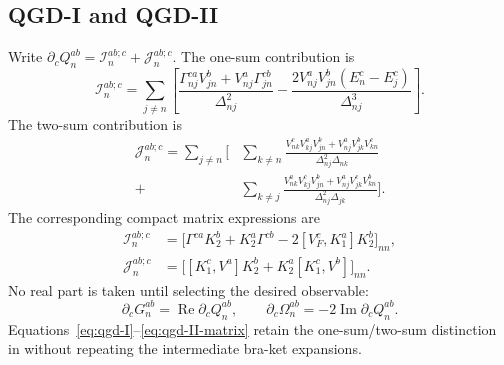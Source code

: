 \documentclass[prx,amsmath,amssymb,superscriptaddress,longbibliography]{revtex4-2}
\newcommand{\Rea}{\operatorname{Re}}
\newcommand{\Ima}{\operatorname{Im}}
\newcommand{\code}[1]{\texttt{\detokenize{#1}}}
\begin{document}
\subsection{QGD-I and QGD-II}
Write $\partial_cQ_n^{ab}=\mathcal I_n^{ab;c}+\mathcal J_n^{ab;c}$.
The one-sum contribution is
\begin{equation}
 \mathcal I_n^{ab;c}=\sum_{j\ne n}\left[
 \frac{\Gamma_{nj}^{ca}V_{jn}^b+V_{nj}^a\Gamma_{jn}^{cb}}{\Delta_{nj}^2}
 -\frac{2V_{nj}^aV_{jn}^b(E_n^c-E_j^c)}{\Delta_{nj}^3}\right].
 \label{eq:qgd-I}
\end{equation}
The two-sum contribution is
\begin{align}
 \mathcal J_n^{ab;c}=\sum_{j\ne n}\bigg[
 &\sum_{k\ne n}\frac{V_{nk}^cV_{kj}^aV_{jn}^b
                        +V_{nj}^aV_{jk}^bV_{kn}^c}
                       {\Delta_{nj}^2\Delta_{nk}}
 \nonumber\\
 +&\sum_{k\ne j}\frac{V_{nk}^aV_{kj}^cV_{jn}^b
                        +V_{nj}^aV_{jk}^cV_{kn}^b}
                       {\Delta_{nj}^2\Delta_{jk}}\bigg].
 \label{eq:qgd-II}
\end{align}
The corresponding compact matrix expressions are
\begin{align}
 \mathcal I_n^{ab;c}
 &=\big[\Gamma^{ca}K_2^b+K_2^a\Gamma^{cb}
        -2[V_F^c,K_1^a]K_2^b\big]_{nn},\label{eq:qgd-I-matrix}\\
 \mathcal J_n^{ab;c}
 &=\big[[K_1^c,V^a]K_2^b+K_2^a[K_1^c,V^b]\big]_{nn}.
 \label{eq:qgd-II-matrix}
\end{align}
No real part is taken until selecting the desired observable:
\begin{equation}
 \partial_cG_n^{ab}=\Rea\partial_cQ_n^{ab},\qquad
 \partial_c\Omega_n^{ab}=-2\Ima\partial_cQ_n^{ab}.
 \label{eq:qgd-observables}
\end{equation}
Equations~\eqref{eq:qgd-I}--\eqref{eq:qgd-II-matrix} retain the
one-sum/two-sum distinction in \code{QGD.tex} without repeating the intermediate bra-ket expansions.
\end{document}
